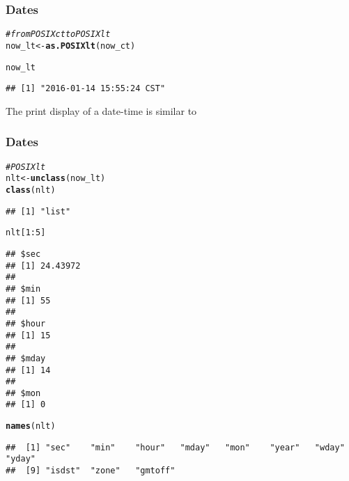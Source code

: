 \documentclass[12pt]{beamer}\usepackage[]{graphicx}\usepackage[]{color}
\makeatletter
\newcommand{\hlnum}[1]{\textcolor[rgb]{0.686,0.059,0.569}{#1}}%
\newcommand{\hlcom}[1]{\textcolor[rgb]{0.678,0.584,0.686}{\textit{#1}}}%
\newcommand{\hlopt}[1]{\textcolor[rgb]{0,0,0}{#1}}%
\newcommand{\hlstd}[1]{\textcolor[rgb]{0.345,0.345,0.345}{#1}}%
\newcommand{\hlkwb}[1]{\textcolor[rgb]{0.69,0.353,0.396}{#1}}%
\newcommand{\hlkwd}[1]{\textcolor[rgb]{0.737,0.353,0.396}{\textbf{#1}}}%
\newenvironment{kframe}{%
 \def\at@end@of@kframe{}%
 \ifinner\ifhmode%
  \def\at@end@of@kframe{\end{minipage}}%
  \begin{minipage}{\columnwidth}%
 \fi\fi%
 \def\FrameCommand##1{\hskip\@totalleftmargin \hskip-\fboxsep
 \colorbox{shadecolor}{##1}\hskip-\fboxsep
     \hskip-\linewidth \hskip-\@totalleftmargin \hskip\columnwidth}%
 \MakeFramed {\advance\hsize-\width
   \@totalleftmargin\z@ \linewidth\hsize
   \@setminipage}}%
 {\par\unskip\endMakeFramed%
 \at@end@of@kframe}
\newenvironment{knitrout}{}{} %
\makeatother
\begin{document}
\begin{frame}[fragile]
\frametitle{ Dates}

\begin{knitrout}\footnotesize
{}\color{fgcolor}\begin{kframe}
\begin{alltt}
\hlcom{# from POSIXct to POSIXlt}
\hlstd{now_lt} \hlkwb{<-} \hlkwd{as.POSIXlt}\hlstd{(now_ct)}

\hlstd{now_lt}
\end{alltt}
\begin{verbatim}
## [1] "2016-01-14 15:55:24 CST"
\end{verbatim}
\end{kframe}
\end{knitrout}
The print display of a  date-time is similar to 

\end{frame}


\begin{frame}[fragile]
\frametitle{ Dates}

\begin{knitrout}\footnotesize
{}\color{fgcolor}\begin{kframe}
\begin{alltt}
\hlcom{# POSIXlt}
\hlstd{nlt} \hlkwb{<-} \hlkwd{unclass}\hlstd{(now_lt)}
\hlkwd{class}\hlstd{(nlt)}
\end{alltt}
\begin{verbatim}
## [1] "list"
\end{verbatim}
\begin{alltt}
\hlstd{nlt[}\hlnum{1}\hlopt{:}\hlnum{5}\hlstd{]}
\end{alltt}
\begin{verbatim}
## $sec
## [1] 24.43972
## 
## $min
## [1] 55
## 
## $hour
## [1] 15
## 
## $mday
## [1] 14
## 
## $mon
## [1] 0
\end{verbatim}
\begin{alltt}
\hlkwd{names}\hlstd{(nlt)}
\end{alltt}
\begin{verbatim}
##  [1] "sec"    "min"    "hour"   "mday"   "mon"    "year"   "wday"   "yday"  
##  [9] "isdst"  "zone"   "gmtoff"
\end{verbatim}
\end{kframe}
\end{knitrout}

\end{frame}
\end{document}
